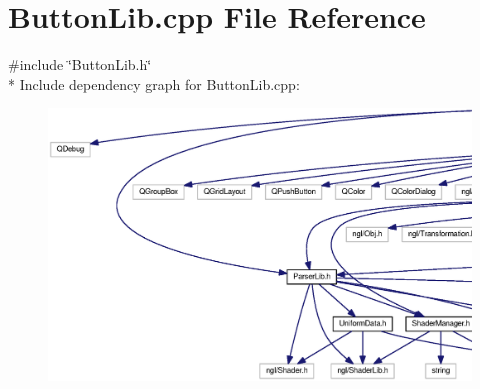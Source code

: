 \section{Button\-Lib.\-cpp File Reference}
\label{_button_lib_8cpp}
{\ttfamily \#include \char`\"{}Button\-Lib.\-h\char`\"{}}\\*
Include dependency graph for Button\-Lib.\-cpp\-:\nopagebreak
\begin{figure}[H]
\begin{center}
\leavevmode
\includegraphics[width=350pt]{_button_lib_8cpp__incl}
\end{center}
\end{figure}
